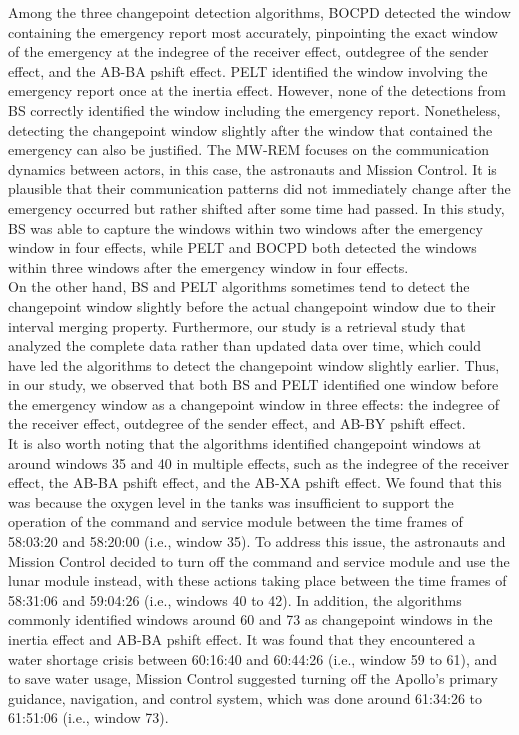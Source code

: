 \documentclass[]{interact}
\theoremstyle{plain}%
\theoremstyle{definition}
\theoremstyle{remark}
\begin{document}
	Among the three changepoint detection algorithms, BOCPD detected the window containing the emergency report most accurately, pinpointing the exact window of the emergency at the indegree of the receiver effect, outdegree of the sender effect, and the AB-BA pshift effect. PELT identified the window involving the emergency report once at the inertia effect. However, none of the detections from BS correctly identified the window including the emergency report. Nonetheless, detecting the changepoint window slightly after the window that contained the emergency can also be justified. The MW-REM focuses on the communication dynamics between actors, in this case, the astronauts and Mission Control. It is plausible that their communication patterns did not immediately change after the emergency occurred but rather shifted after some time had passed. In this study, BS was able to capture the windows within two windows after the emergency window in four effects, while PELT and BOCPD both detected the windows within three windows after the emergency window in four effects. \\
	
	On the other hand, BS and PELT algorithms sometimes tend to detect the changepoint window slightly before the actual changepoint window due to their interval merging property. Furthermore, our study is a retrieval study that analyzed the complete data rather than updated data over time, which could have led the algorithms to detect the changepoint window slightly earlier. Thus, in our study, we observed that both BS and PELT identified one window before the emergency window as a changepoint window in three effects: the indegree of the receiver effect, outdegree of the sender effect, and AB-BY pshift effect. \\
	
	It is also worth noting that the algorithms identified changepoint windows at around windows 35 and 40 in multiple effects, such as the indegree of the receiver effect, the AB-BA pshift effect, and the AB-XA pshift effect. We found that this was because the oxygen level in the tanks was insufficient to support the operation of the command and service module between the time frames of 58:03:20 and 58:20:00 (i.e., window 35). To address this issue, the astronauts and Mission Control decided to turn off the command and service module and use the lunar module instead, with these actions taking place between the time frames of 58:31:06 and 59:04:26 (i.e., windows 40 to 42). In addition, the algorithms commonly identified windows around 60 and 73 as changepoint windows in the inertia effect and AB-BA pshift effect. It was found that they encountered a water shortage crisis between 60:16:40 and 60:44:26 (i.e., window 59 to 61), and to save water usage, Mission Control suggested turning off the Apollo’s primary guidance, navigation, and control system, which was done around 61:34:26 to 61:51:06 (i.e., window 73). \\
	
\end{document}
